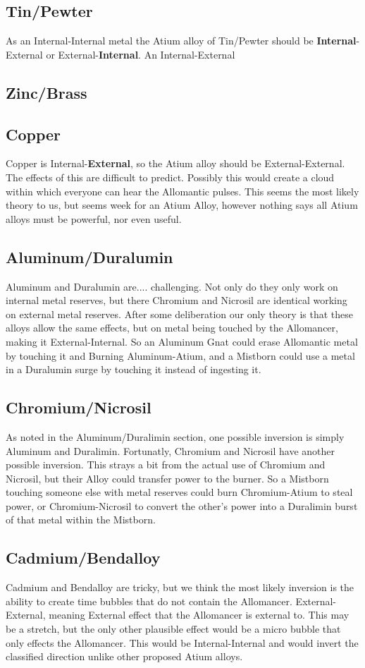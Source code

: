 \documentclass[conference]{IEEEtran}
\begin{document}
\subsection*{Tin/Pewter}
As an Internal-Internal metal the Atium alloy of Tin/Pewter should be \textbf{Internal}-External or External-\textbf{Internal}.  An Internal-External
\subsection*{Zinc/Brass}

\subsection*{Copper}
Copper is Internal-\textbf{External}, so the Atium alloy should be External-External.  The effects of this are difficult to predict.  Possibly this would create a cloud within which everyone can hear the Allomantic pulses.
This seems the most likely theory to us, but seems week for an Atium Alloy, however nothing says all Atium alloys must be powerful, nor even useful.
\subsection*{Aluminum/Duralumin}
Aluminum and Duralumin are.... challenging.  Not only do they only work on internal metal reserves, but there Chromium and Nicrosil are identical working on external metal reserves.  After some deliberation our only theory is that these alloys allow the same effects, but on metal being touched by the Allomancer, making it External-Internal.  So an Aluminum Gnat could erase Allomantic metal by touching it and Burning Aluminum-Atium, and a Mistborn could use a metal in a Duralumin surge by touching it instead of ingesting it.
\subsection*{Chromium/Nicrosil}
As noted in the Aluminum/Duralimin section, one possible inversion is simply Aluminum and Duralimin.  Fortunatly, Chromium and Nicrosil have another possible inversion.  This strays a bit from the actual use of Chromium and Nicrosil, but their Alloy could transfer power to the burner.  So a Mistborn touching someone else with metal reserves could burn Chromium-Atium to steal power, or Chromium-Nicrosil to convert the other's power into a Duralimin burst of that metal within the Mistborn.
\subsection*{Cadmium/Bendalloy}
Cadmium and Bendalloy are tricky, but we think the most likely inversion is the ability to create time bubbles that do not contain the Allomancer.  External-External, meaning External effect that the Allomancer is external to.  This may be a stretch, but the only other plausible effect would be a micro bubble that only effects the Allomancer.  This would be Internal-Internal and would invert the classified direction unlike other proposed Atium alloys.
\end{document}
